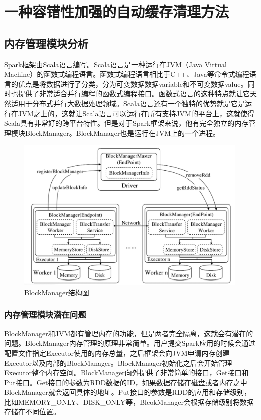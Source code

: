 \chapter{一种容错性加强的自动缓存清理方法}\label{chap:clean}

\section{内存管理模块分析}

Spark框架由Scala语言编写。Scala语言是一种运行在JVM（Java Virtual Machine）的函数式编程语言。函数式编程语言相比于C++、Java等命令式编程语言的优点是将数据进行了分类，分为可变数据数据variable和不可变数据value。同时也提供了非常适合并行编程的函数式编程接口。函数式语言的这种特点就让它天然适用于分布式并行大数据处理领域。Scala语言还有一个独特的优势就是它是运行在JVM之上的，这就让Scala语言可以运行在所有支持JVM的平台上，这就使得Scala具有非常好的跨平台特性。但是对于Spark框架来说，他有完全独立的内存管理模块BlockManager。BlockManager也是运行在JVM上的一个进程。

\begin{figure}[htbp]
    \centering
    \includegraphics[width=0.99\textwidth]{Img/block-manager.jpg}
    \caption{BlockManager结构图}
    \label{fig:block-manager}
\end{figure}

\subsection{内存管理模块潜在问题}

BlockManager和JVM都有管理内存的功能，但是两者完全隔离，这就会有潜在的问题。BlockManager内存管理的原理非常简单。用户提交Spark应用的时候会通过配置文件指定Executor使用的内存总量，之后框架会向JVM申请内存创建Executor以及内部的BlockManager。BlockManager初始化之后会开始管理Executor整个内存空间。BlockManager向外提供了非常简单的接口，Get接口和Put接口。Get接口的参数为RDD数据的ID，如果数据存储在磁盘或者内存之中BlockManager就会返回具体的地址。Put接口的参数是RDD的应用和存储级别，比如MEMORY\_ONLY、DISK\_ONLY等，BlcokManager会根据存储级别将数据存储在不同位置。

